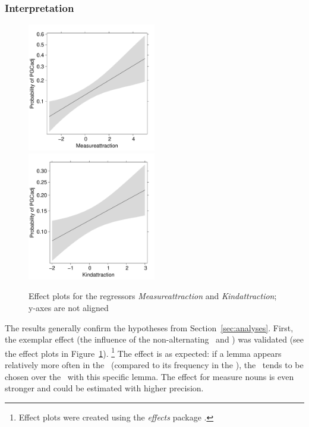 \subsubsection{Interpretation}
\label{sec:mainstudyinterpretation}

\begin{figure}[h!]
  \centering
  \includegraphics[width=0.5\textwidth]{../R/output/corpus_Measureattraction}~\includegraphics[width=0.5\textwidth]{../R/output/corpus_Kindattraction}
  \caption{Effect plots for the regressors \textit{Measureattraction} and \textit{Kindattraction}; y-axes are not aligned}
  \label{fig:eff:attraction}
\end{figure}

The results generally confirm the hypotheses from Section~\ref{sec:analyses}.
First, the exemplar effect (the influence of the non-alternating \PGCd\ and \NACb) was validated (see the effect plots in Figure~\ref{fig:eff:attraction}).%
\footnote{Effect plots were created using the \textit{effects} package \citep{Fox2003}.}
The effect is as expected:
if a lemma appears relatively more often in the \PGCd\ (compared to its frequency in the \NACb), the \PGCa\ tends to be chosen over the \NACa\ with this specific lemma.
The effect for measure nouns is even stronger and could be estimated with higher precision.

